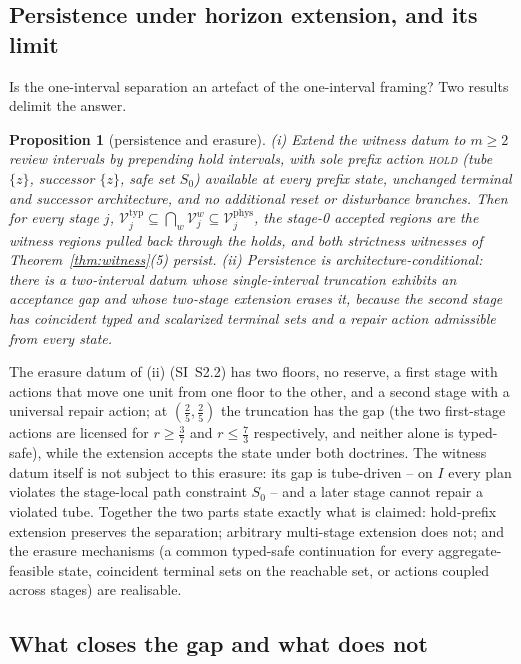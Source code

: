 \documentclass[preprint,11pt,authoryear]{elsarticle}
\newtheorem{proposition}{Proposition}
\theoremstyle{definition}
\theoremstyle{remark}
\newcommand{\act}[1]{\textsc{#1}}
\begin{document}
\subsection{Persistence under horizon extension, and its limit}\label{sec:persist}

Is the one-interval separation an artefact of the one-interval framing? Two results delimit the answer.

\begin{proposition}[persistence and erasure]\label{prop:persist}
\textup{(i)} Extend the witness datum to $m\ge2$ review intervals by prepending hold intervals, with sole prefix action \act{hold} (tube $\{z\}$, successor $\{z\}$, safe set $S_0$) available at every prefix state, unchanged terminal and successor architecture, and no additional reset or disturbance branches. Then for every stage $j$, $\mathcal V^{\mathrm{typ}}_j\subseteq\bigcap_{w}\mathcal V^{w}_j\subseteq\mathcal V^{\mathrm{phys}}_j$, the stage-0 accepted regions are the witness regions pulled back through the holds, and both strictness witnesses of Theorem~\ref{thm:witness}(5) persist.
\textup{(ii)} Persistence is architecture-conditional: there is a two-interval datum whose single-interval truncation exhibits an acceptance gap and whose two-stage extension erases it, because the second stage has coincident typed and scalarized terminal sets and a repair action admissible from every state.
\end{proposition}

The erasure datum of (ii) (SI~S2.2) has two floors, no reserve, a first stage with actions that move one unit from one floor to the other, and a second stage with a universal repair action; at $(\tfrac25,\tfrac25)$ the truncation has the gap (the two first-stage actions are licensed for $r\ge\tfrac37$ and $r\le\tfrac73$ respectively, and neither alone is typed-safe), while the extension accepts the state under both doctrines. The witness datum itself is not subject to this erasure: its gap is tube-driven -- on $I$ every plan violates the stage-local path constraint $S_0$ -- and a later stage cannot repair a violated tube. Together the two parts state exactly what is claimed: hold-prefix extension preserves the separation; arbitrary multi-stage extension does not; and the erasure mechanisms (a common typed-safe continuation for every aggregate-feasible state, coincident terminal sets on the reachable set, or actions coupled across stages) are realisable.

\subsection{What closes the gap and what does not}\label{sec:closing}
\end{document}
